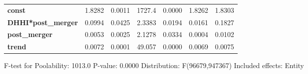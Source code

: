 \documentclass{report}
\begin{document}
\begin{center}
\begin{tabular}{lcccccc}
\midrule
\textbf{const}             &       1.8282       &       0.0011       &      1727.4     &      0.0000      &       1.8262      &       1.8303       \\
\textbf{DHHI*post\_merger} &       0.0994       &       0.0425       &      2.3383     &      0.0194      &       0.0161      &       0.1827       \\
\textbf{post\_merger}      &       0.0053       &       0.0025       &      2.1278     &      0.0334      &       0.0004      &       0.0102       \\
\textbf{trend}             &       0.0072       &       0.0001       &      49.057     &      0.0000      &       0.0069      &       0.0075       \\
\bottomrule
\end{tabular}
\end{center}

F-test for Poolability: 1013.0 \newline
 P-value: 0.0000 \newline
 Distribution: F(96679,947367) \newline
  \newline
 Included effects: Entity
\end{document}

